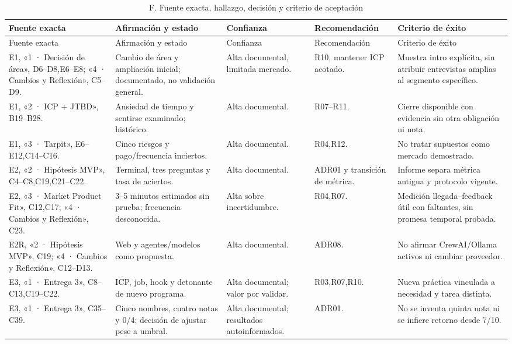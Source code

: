 \documentclass[11pt,a4paper]{report}
\begin{document}
\begin{landscape}
\small
\begin{longtable}{P{6cm}P{6cm}P{3cm}P{4cm}P{4.4cm}}
\caption{F. Fuente exacta, hallazgo, decisión y criterio de aceptación}\label{tab:traza}\\
\toprule Fuente exacta & Afirmación y estado & Confianza & Recomendación & Criterio de éxito \\\midrule\endfirsthead
\toprule Fuente exacta & Afirmación y estado & Confianza & Recomendación & Criterio de éxito \\\midrule\endhead
E1, «1 · Decisión de área», D6--D8,E6--E8; «4 · Cambios y Reflexión», C5--D9. & Cambio de área y ampliación inicial; documentado, no validación general. & Alta documental, limitada mercado. & R10, mantener ICP acotado. & Muestra intro explícita, sin atribuir entrevistas amplias al segmento específico.\\
E1, «2 · ICP + JTBD», B19--B28. & Ansiedad de tiempo y sentirse examinado; histórico. & Alta documental. & R07--R11. & Cierre disponible con evidencia sin otra obligación ni nota.\\
E1, «3 · Tarpit», E6--E12,C14--C16. & Cinco riesgos y pago/frecuencia inciertos. & Alta documental. & R04,R12. & No tratar supuestos como mercado demostrado.\\
E2, «2 · Hipótesis MVP», C4--C8,C19,C21--C22. & Terminal, tres preguntas y tasa de aciertos. & Alta documental. & ADR01 y transición de métrica. & Informe separa métrica antigua y protocolo vigente.\\
E2, «3 · Market Product Fit», C12,C17; «4 · Cambios y Reflexión», C23. & 3--5 minutos estimados sin prueba; frecuencia desconocida. & Alta sobre incertidumbre. & R04,R07. & Medición llegada--feedback útil con faltantes, sin promesa temporal probada.\\
E2R, «2 · Hipótesis MVP», C19; «4 · Cambios y Reflexión», C12--D13. & Web y agentes/modelos como propuesta. & Alta documental. & ADR08. & No afirmar CrewAI/Ollama activos ni cambiar proveedor.\\
E3, «1 · Entrega 3», C8--C13,C19--C22. & ICP, job, hook y detonante de nuevo programa. & Alta documental; valor por validar. & R03,R07,R10. & Nueva práctica vinculada a necesidad y tarea distinta.\\
E3, «1 · Entrega 3», C35--C39. & Cinco nombres, cuatro notas y 0/4; decisión de ajustar pese a umbral. & Alta documental; resultados autoinformados. & ADR01. & No se inventa quinta nota ni se infiere retorno desde 7/10.\\

\end{longtable}
\end{landscape}
\end{document}
